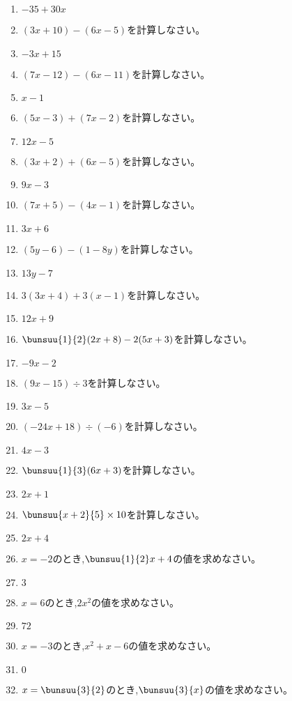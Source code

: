 \documentclass[uplatex,a4j,11pt]{jsreport}
\begin{document}
\begin{multicols}{2}
\begin{enumerate}
    \item $-35+30x$
    \item $(3x+10)-(6x-5)$\quad を計算しなさい。%
    \item $-3x+15$
    \item $(7x-12)-(6x-11)$\quad を計算しなさい。%
    \item $x-1$
    \item $(5x-3)+(7x-2)$\quad を計算しなさい。%
    \item $12x-5$
    \item $(3x+2)+(6x-5)$\quad を計算しなさい。%
    \item $9x-3$
    \item $(7x+5)-(4x-1)$\quad を計算しなさい。%
    \item $3x+6$
    \item $(5y-6)-(1-8y)$\quad を計算しなさい。%
    \item $13y-7$
    \item $3(3x+4)+3(x-1)$\quad を計算しなさい。%
    \item $12x+9$
    \item $\bunsuu{1}{2}(2x+8)-2(5x+3)$\quad を計算しなさい。%
    \item $-9x-2$
    \item $(9x-15)\div 3$\quad を計算しなさい。%
    \item $3x-5$
    \item $(-24x+18)\div (-6)$\quad を計算しなさい。%
    \item $4x-3$
    \item $\bunsuu{1}{3}(6x+3)$\quad を計算しなさい。%
    \item $2x+1$
    \item $\bunsuu{x+2}{5}\times 10$\quad を計算しなさい。%
    \item $2x+4$
    \item $x=-2$のとき,\quad$\bunsuu{1}{2}x+4$\quad の値を求めなさい。%
    \item $3$
    \item $x=6$のとき,\quad$2x^2$\quad の値を求めなさい。%
    \item $72$
    \item $x=-3$のとき,\quad$x^2+x-6$\quad の値を求めなさい。%
    \item $0$
    \item $x=\bunsuu{3}{2}$のとき,\quad$\bunsuu{3}{x}$\quad の値を求めなさい。%

\end{enumerate}
\end{multicols}
\end{document}
